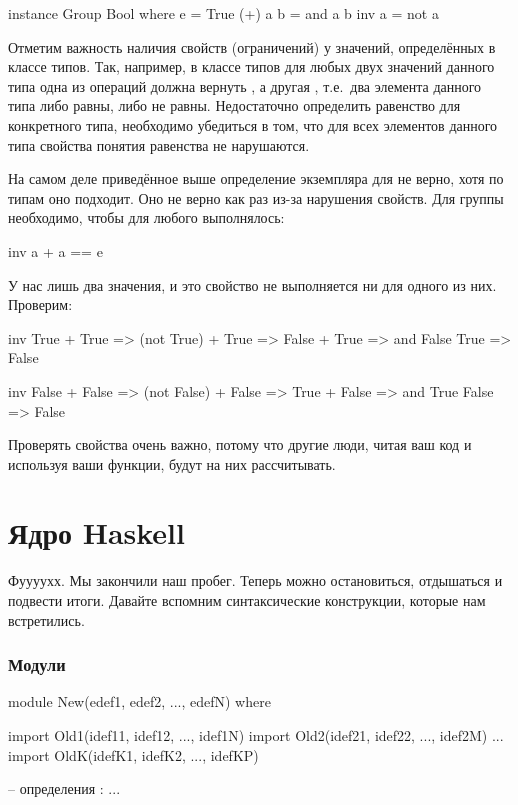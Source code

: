 \begin{code}
instance Group Bool where
    e       = True
    (+) a b = and a b
    inv a   = not a
\end{code}



Отметим важность наличия свойств (ограничений) у значений,
определённых в классе типов. Так, например, в классе типов 
 для любых двух значений данного типа
одна из операций должна вернуть , а другая ,
т.е.~два элемента данного типа либо равны, либо не равны.
Недостаточно определить равенство для конкретного типа, необходимо
убедиться в том, что для всех элементов данного типа свойства 
понятия равенства не нарушаются.

На самом деле приведённое выше определение экземпляра для  
не верно, хотя по типам оно подходит. Оно не верно как раз 
из-за нарушения свойств. Для группы необходимо, чтобы для любого 
выполнялось:

\begin{code}
 inv a + a == e
\end{code}

У нас лишь два значения, и это свойство не выполняется ни для одного
из них. Проверим:

\begin{code}
    inv True   + True
 => (not True) + True
 => False      + True
 => and False    True
 => False

    inv False   + False
 => (not False) + False
 => True        + False
 => and True      False
 => False
\end{code}

Проверять свойства очень важно, потому что другие люди,
читая ваш код и используя ваши функции, будут на них рассчитывать.

\section{Ядро Haskell}

Фуууухх. Мы закончили наш пробег. Теперь можно остановиться,
отдышаться и подвести итоги.
Давайте вспомним синтаксические конструкции, которые нам встретились.

\subsubsection{Модули}

\begin{code}
module New(edef1, edef2, ..., edefN) where

import Old1(idef11, idef12, ..., idef1N)
import Old2(idef21, idef22, ..., idef2M)
...
import OldK(idefK1, idefK2, ..., idefKP)

-- определения :
...
\end{code}

